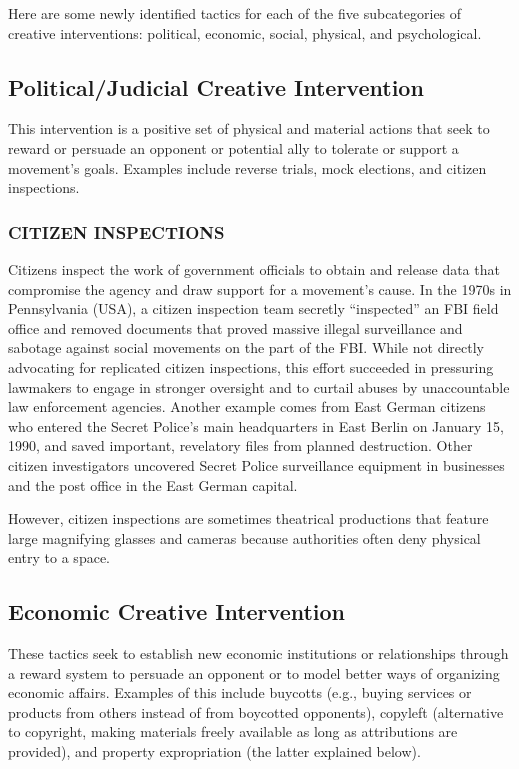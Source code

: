 \documentclass[twoside,a4paper,12pt,fleqn,openany]{extbook}
\begin{document}
Here are some newly identified tactics for each of the five subcategories of creative interventions: political, economic, social, physical, and psychological.

\subsection*{Political/Judicial Creative Intervention}

This intervention is a positive set of physical and material actions that seek to reward or persuade an opponent or potential ally to tolerate or support a movement’s goals. Examples include reverse trials, mock elections, and citizen inspections.

\subsubsection*{CITIZEN INSPECTIONS}

Citizens inspect the work of government officials to obtain and release data that compromise the agency and draw support for a movement’s cause. In the 1970s in Pennsylvania (USA), a citizen inspection team secretly “inspected” an FBI field office and removed documents that proved massive illegal surveillance and sabotage against social movements on the part of the FBI. While not directly advocating for replicated citizen inspections, this effort succeeded in pressuring lawmakers to engage in stronger oversight and to curtail abuses by unaccountable law enforcement agencies. Another example comes from East German citizens who entered the Secret Police’s main headquarters in East Berlin on January 15, 1990, and saved important, revelatory files from planned destruction. Other citizen investigators uncovered Secret Police surveillance equipment in businesses and the post office in the East German capital.

However, citizen inspections are sometimes theatrical productions that feature large magnifying glasses and cameras because authorities often deny physical entry to a space.

\subsection*{Economic Creative Intervention}

These tactics seek to establish new economic institutions or relationships through a reward system to persuade an opponent or to model better ways of organizing economic affairs. Examples of this include buycotts (e.g., buying services or products from others instead of from boycotted opponents), copyleft (alternative to copyright, making materials freely available as long as attributions are provided), and property expropriation (the latter explained below).
\end{document}
